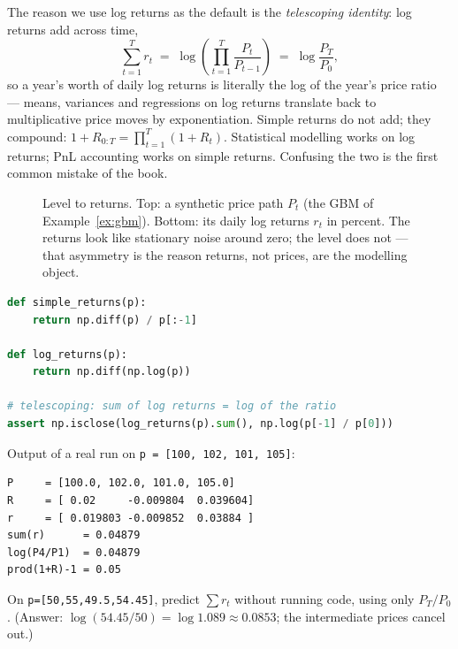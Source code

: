 The reason we use log returns as the default is the \emph{telescoping
identity}: log returns add across time,
\begin{equation}\label{eq:telescope}
\sum_{t=1}^{T} r_t \;=\; \log\!\left(\prod_{t=1}^{T}\frac{P_t}{P_{t-1}}\right)
\;=\; \log\frac{P_T}{P_0},
\end{equation}
so a year's worth of daily log returns is literally the log of the
year's price ratio --- means, variances and regressions on log returns
translate back to multiplicative price moves by exponentiation. Simple
returns do not add; they compound: $1 + R_{0:T} = \prod_{t=1}^{T}(1+R_t)$.
Statistical modelling works on log returns; PnL accounting works on
simple returns. Confusing the two is the first common mistake of the
book.

\begin{figure}[ht]\centering

\caption{Level to returns. Top: a synthetic price path $P_t$ (the GBM
of Example~\ref{ex:gbm}). Bottom: its daily log returns $r_t$ in
percent. The returns look like stationary noise around zero; the level
does not --- that asymmetry is the reason returns, not prices, are the
modelling object.}
\label{fig:levelret}
\end{figure}

\begin{lstlisting}[language=Python,caption={\texttt{code/returns.py} ---
the two definitions and the telescoping check.},label={lst:returns}]
def simple_returns(p):
    return np.diff(p) / p[:-1]

def log_returns(p):
    return np.diff(np.log(p))

# telescoping: sum of log returns = log of the ratio
assert np.isclose(log_returns(p).sum(), np.log(p[-1] / p[0]))
\end{lstlisting}

Output of a real run on \texttt{p = [100, 102, 101, 105]}:
\begin{lstlisting}[numbers=none]
P     = [100.0, 102.0, 101.0, 105.0]
R     = [ 0.02     -0.009804  0.039604]
r     = [ 0.019803 -0.009852  0.03884 ]
sum(r)      = 0.04879
log(P4/P1)  = 0.04879
prod(1+R)-1 = 0.05
\end{lstlisting}

\begin{checkpoint}
On \texttt{p=[50,55,49.5,54.45]}, predict $\sum r_t$ without running
code, using only $P_T/P_0$. (Answer: $\log(54.45/50)=\log 1.089
\approx 0.0853$; the intermediate prices cancel out.)
\end{checkpoint}

